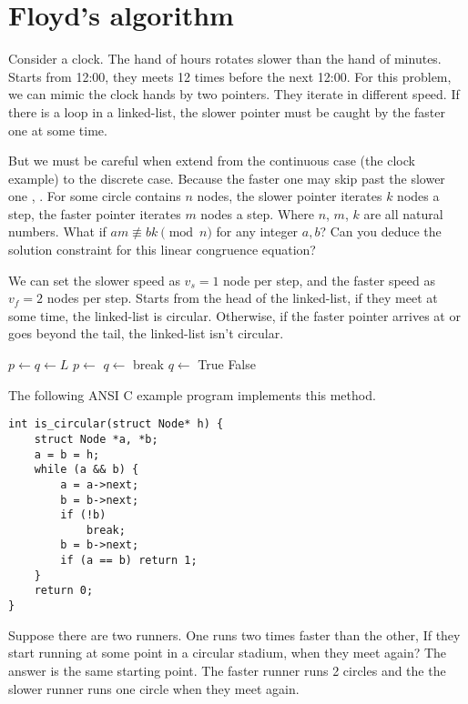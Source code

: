 \documentclass{article}
\begin{document}
\section{Floyd's algorithm}

Consider a clock. The hand of hours rotates slower than the hand of minutes. Starts
from 12:00, they meets 12 times before the next 12:00. For this problem,
we can mimic the clock hands by two pointers. They iterate in different speed.
If there is a loop in a linked-list, the slower pointer must be caught by the faster
one at some time.

But we must be careful when extend from the continuous case (the clock example) to
the discrete case. Because the faster one may skip past the slower one \cite{Stepanov09}, \cite{TAOCP2}.
For some circle contains $n$ nodes, the
slower pointer iterates $k$ nodes a step, the faster pointer iterates $m$ nodes a step.
Where $n$, $m$, $k$ are all natural numbers. What if $am \not\equiv bk \pmod n$ for
any integer $a, b$? Can you deduce the solution constraint for this linear congruence equation?

We can set the slower speed as $v_s = 1$ node per step,
and the faster speed as $v_f = 2$ nodes per step. Starts from the head of the linked-list, if they
meet at some time, the linked-list is circular. Otherwise, if the faster pointer
arrives at or goes beyond the tail, the linked-list isn't circular.

\begin{algorithmic}[1]
  \State $p \gets q \gets L$
    \State $p \gets$ 
    \State $q \gets$ 
      \State break
    \EndIf
    \State $q \gets$ 
      \State \Return True
    \EndIf
  \EndWhile
  \State \Return False
\EndFunction
\end{algorithmic}

The following ANSI C example program implements this method.

\lstset{language=C}
\begin{lstlisting}
int is_circular(struct Node* h) {
    struct Node *a, *b;
    a = b = h;
    while (a && b) {
        a = a->next;
        b = b->next;
        if (!b)
            break;
        b = b->next;
        if (a == b) return 1;
    }
    return 0;
}
\end{lstlisting}

Suppose there are two runners. One runs two times faster than the other, If they start
running at some point in a circular stadium, when they meet again? The answer is the
same starting point. The faster runner runs 2 circles and the the slower runner runs
one circle when they meet again.
\end{document}
